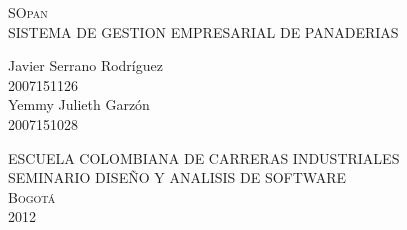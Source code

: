 \begin{titlepage}
\setlength{\parindent}{0pt} \setlength{\parskip}{0pt}

\begin{center}

\textsc{\large SOpan}\\[0.2cm]
{\large SISTEMA DE GESTION EMPRESARIAL DE PANADERIAS}\\[1cm]
\end{center}

\begin{center}

\end{center}

\begin{center}

\vfill
{\Large Javier Serrano Rodr\'iguez\\2007151126\\Yemmy Julieth Garz\'on\\2007151028}\\[0.4cm]
\end{center}
\vfill
\begin{center}
\large \textsc{ESCUELA COLOMBIANA DE CARRERAS INDUSTRIALES\\SEMINARIO DISE\~NO Y ANALISIS DE SOFTWARE\\Bogot\'a\\2012}
\end{center}
\end{titlepage}